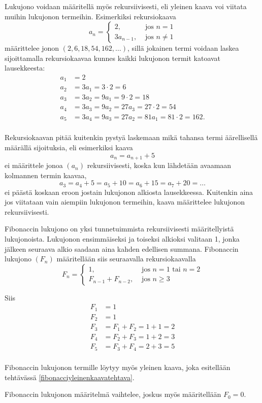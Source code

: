 Lukujono voidaan määritellä myös rekursiivisesti, eli yleinen kaava voi viitata muihin lukujonon termeihin. Esimerkiksi rekursiokaava
\[a_n = \left\{\begin{array}{ll}
2,&\text{ jos } n = 1 \\
3a_{n-1},&\text{ jos } n \neq 1
\end{array}\right.\]
määrittelee jonon $(2, 6, 18, 54, 162, \ldots)$, sillä jokainen termi voidaan laskea sijoittamalla rekursiokaavaa kunnes kaikki lukujonon termit katoavat lausekkeesta:
\begin{align*}
a_1 &= 2 \\
a_2 &= 3 a_1 = 3\cdot 2 = 6 \\
a_3 &= 3 a_2 = 9 a_1 = 9\cdot 2 = 18 \\
a_4 &= 3 a_3 = 9 a_2 = 27 a_3 = 27 \cdot 2 = 54 \\
a_5 &= 3 a_4 = 9 a_3 = 27 a_2 = 81 a_1 = 81\cdot 2 = 162. \\
\end{align*}

Rekursiokaavan pitää kuitenkin pystyä laskemaan mikä tahansa termi äärellisellä määrällä sijoituksia, eli esimerkiksi kaava
\[a_n = a_{n + 1} + 5\]
ei määrittele jonoa $(a_n)$ rekursiivisesti, koska kun lähdetään avaamaan kolmannen termin kaavaa,
\[a_3 = a_4 + 5 = a_5 + 10 = a_6 + 15 = a_7 + 20 = \ldots\]
ei päästä koskaan eroon jostain lukujonon alkiosta lausekkeessa. Kuitenkin aina jos viitataan vain aiempiin lukujonon termeihin, kaava määrittelee lukujonon rekursiivisesti.

\begin{esimerkki}
Fibonaccin lukujono on yksi tunnetuimmista rekursiivisesti määritellyistä lukujonoista. Lukujonon ensimmäiseksi ja toiseksi alkioksi valitaan 1, jonka jälkeen seuraava alkio saadaan aina kahden edellisen summana. Fibonaccin lukujono $(F_n)$ määritellään siis seuraavalla rekursiokaavalla
\[F_n = \left\{\begin{array}{ll}
1,&\text{ jos } n = 1 \text{ tai } n = 2 \\
F_{n - 1} + F_{n - 2},&\text{ jos } n \geq 3
\end{array}\right.\]

Siis
\begin{align*}
F_1 &= 1 \\
F_2 &= 1 \\
F_3 &= F_1 + F_2 = 1 + 1 = 2 \\
F_4 &= F_2 + F_3 = 1 + 2 = 3 \\
F_5 &= F_3 + F_4 = 2 + 3 = 5 \\
\end{align*}

Fibonaccin lukujonon termille löytyy myös yleinen kaava, joka esitellään tehtävässä \ref{fibonacciyleinenkaavatehtava}.

Fibonaccin lukujonon määritelmä vaihtelee, joskus myös määritellään $F_0 = 0$.
\end{esimerkki}

